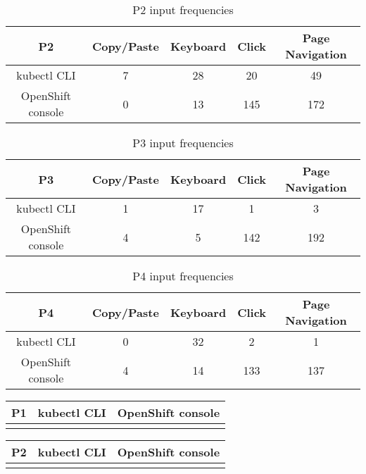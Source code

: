 \documentclass[11pt, oneside]{article}   	%
\begin{document}
\begin{table}
 \centering
  \begin{tabular}{ | c | c | c | c | c | } 
  \hline
  P2 & Copy/Paste & Keyboard & Click & Page Navigation \\ 
  \hline
  kubectl CLI & 7 & 28 & 20 & 49 \\ 
  \hline
  OpenShift console & 0 & 13 & 145 & 172 \\ 
  \hline
  \end{tabular}
 \caption{P2 input frequencies}
\end{table}

\begin{table}
 \centering
  \begin{tabular}{ | c | c | c | c | c | } 
  \hline
  P3 & Copy/Paste & Keyboard & Click & Page Navigation \\ 
  \hline
  kubectl CLI & 1 & 17 & 1 & 3 \\ 
  \hline
  OpenShift console & 4 & 5 & 142 & 192 \\ 
  \hline
  \end{tabular}
 \caption{P3 input frequencies}
\end{table}

\begin{table}
 \centering
  \begin{tabular}{ | c | c | c | c | c | } 
  \hline
  P4 & Copy/Paste & Keyboard & Click & Page Navigation \\ 
  \hline
  kubectl CLI & 0 & 32 & 2 & 1 \\ 
  \hline
  OpenShift console & 4 & 14 & 133 & 137 \\ 
  \hline
  \end{tabular}
 \caption{P4 input frequencies}
\end{table}

\begin{center}
\begin{tabular}{ | c | c | c | } 
  \hline
  P1 & kubectl CLI & OpenShift console \\ 
  \hline
   &  &  \\ 
  \hline
\end{tabular}
\end{center}

\begin{center}
\begin{tabular}{ | c | c | c | } 
  \hline
  P2 & kubectl CLI & OpenShift console \\ 
  \hline
   &  &  \\ 
  \hline
\end{tabular}
\end{center}
\end{document}
